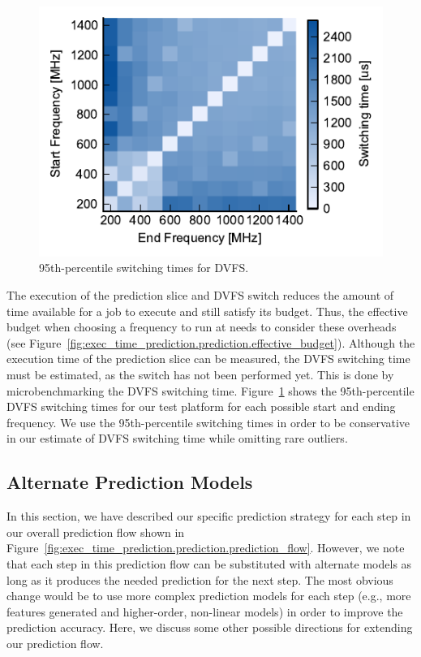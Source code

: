 \begin{figure}
  \begin{center}
    \includegraphics{exec_time_prediction/data/dvfs_heatmap.pdf}
    \caption{95th-percentile switching times for DVFS.}
    \label{fig:exec_time_prediction.prediction.dvfs_heatmap}
  \end{center}
\end{figure}

The execution of the prediction slice and DVFS switch reduces the amount of
time available for a job to execute and still satisfy its budget. Thus, the
effective budget when choosing a frequency to run at needs to consider these
overheads (see
Figure~\ref{fig:exec_time_prediction.prediction.effective_budget}). Although
the execution time of the prediction slice can be measured, the DVFS switching
time must be estimated, as the switch has not been performed yet.  This is done
by microbenchmarking the DVFS switching time.
Figure~\ref{fig:exec_time_prediction.prediction.dvfs_heatmap} shows the
95th-percentile DVFS switching times for our test platform for each possible
start and ending frequency. We use the 95th-percentile switching times in order
to be conservative in our estimate of DVFS switching time while omitting rare
outliers. 

\subsection{Alternate Prediction Models}
\label{sec:exec_time_prediction.prediction.alternate_models}

In this section, we have described our specific prediction strategy for each
step in our overall prediction flow shown in
Figure~\ref{fig:exec_time_prediction.prediction.prediction_flow}. However, we
note that each step in this prediction flow can be substituted with alternate
models as long as it produces the needed prediction for the next step.  The
most obvious change would be to use more complex prediction models for each
step (e.g., more features generated and higher-order, non-linear models) in
order to improve the prediction accuracy.  
Here, we discuss some other possible directions for extending our prediction flow.

